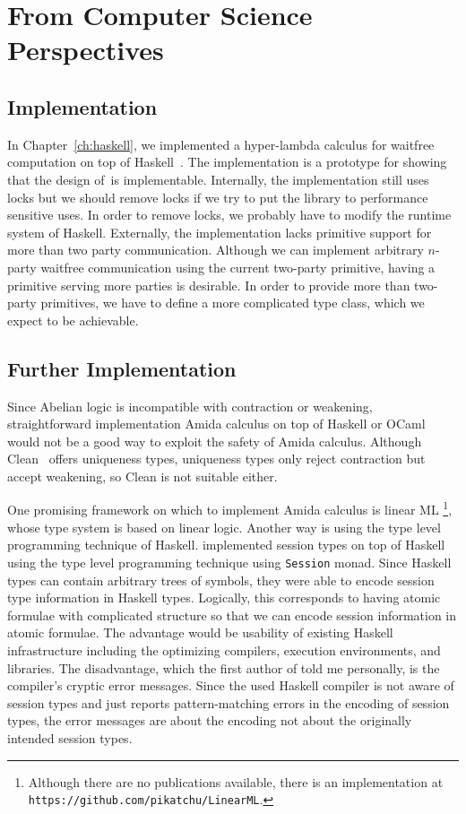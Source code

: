 \section{From Computer Science Perspectives}

\subsection{Implementation}

In Chapter~\ref{ch:haskell}, we implemented a hyper-lambda calculus for
waitfree computation on top of Haskell~\citep{marlow2010haskell}.
The implementation is a prototype for showing that the design of \lgd\,is
implementable.
Internally, the implementation still uses locks but we should remove
locks if we try to put the library to performance sensitive uses.
In order to remove locks, we probably have to modify the runtime system
of Haskell.
Externally, the implementation lacks primitive support for more than two
party communication.  Although we can implement arbitrary $n$-party
waitfree communication using the current two-party primitive, having
a primitive serving more parties is desirable.
In order to provide more than two-party primitives,
we have to define a more complicated type class, which we expect to be
achievable.

\subsection{Further Implementation}

Since Abelian logic is incompatible with contraction or weakening,
straightforward implementation Amida calculus on top of Haskell or OCaml
would not be a
good way to exploit the safety of Amida calculus.
Although Clean~\citep{parle1991} offers uniqueness types,
uniqueness types only reject contraction but accept weakening, so Clean
is not suitable either.

One promising framework on which to implement Amida calculus is linear ML%
\footnote{Although there are no
publications available, there is an implementation at
\texttt{https://github.com/pikatchu/LinearML}\enspace.},
whose type system is based on linear logic.
Another way is using the type level programming technique of Haskell.
\citet{DBLP:journals/corr/abs-1110-4163} implemented session types on top
of Haskell using the type level programming technique using
\texttt{Session} monad.  Since Haskell types can contain arbitrary trees
of symbols, they were able to encode session type information in Haskell
types.
Logically, this corresponds to having atomic formulae with complicated
structure so that we can encode session information in atomic formulae.
The advantage would be usability of existing Haskell infrastructure
including the optimizing compilers, execution environments, and
libraries.
The disadvantage, which the first author of
\citep{DBLP:journals/corr/abs-1110-4163} told me personally,
is the compiler's cryptic error messages.
Since the used Haskell compiler is not aware of session types and just reports
pattern-matching errors in the encoding of session types, the error
messages are about the encoding not about the originally intended
session types.

